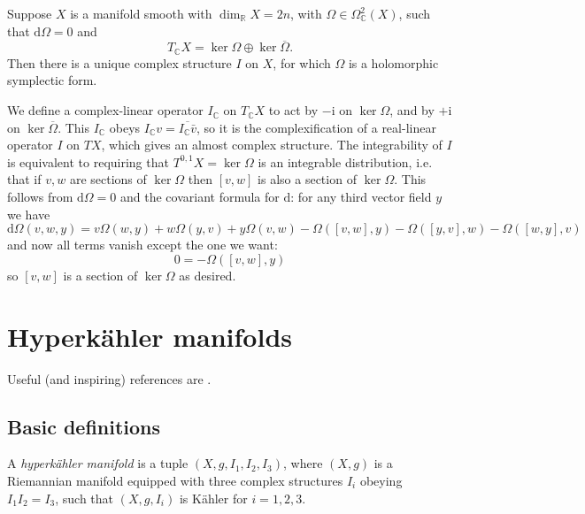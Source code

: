 \documentclass[12pt,letterpaper,reqno]{article}
\numberwithin{equation}{section}
\newcommand{\R}{\ensuremath{\mathbb R}}
\newcommand{\C}{\ensuremath{\mathbb C}}
\newcommand{\kahler}{K\"ahler\xspace}
\newcommand{\hk}{hyperk\"ahler\xspace}
\newcommand{\Hk}{Hyperk\"ahler\xspace}
\newcommand{\I}{{\mathrm i}}
\newcommand{\de}{\mathrm{d}}
\newcommand{\ti}[1]{\textit{#1}}
\begin{document}
\begin{prop} \label{prop:hol-symp-to-complex}
Suppose $X$ is a manifold smooth with $\dim_\R X = 2n$, 
with $\Omega \in \Omega^2_\C(X)$, such that $\de \Omega = 0$ and
\begin{equation}
 T_\C X = \ker \Omega \oplus \ker \overline\Omega. 
\end{equation}
Then there is a 
unique complex structure $I$ on $X$, for which $\Omega$
is a holomorphic symplectic form.
\end{prop}
\begin{pf} We define a complex-linear operator 
$I_\C$ on $T_\C X$ to act by $-\I$ on
$\ker \Omega$, and by $+\I$ on $\ker \overline\Omega$.
This $I_\C$ obeys $I_\C v = \overline{I_\C \bar{v}}$, so it is the 
complexification of a real-linear operator $I$ on $TX$,
which gives an almost complex structure.
The integrability of $I$ is equivalent to requiring
that $T^{0,1} X = \ker \Omega$ is an integrable distribution,
i.e. that if $v,w$ are sections of $\ker \Omega$ then $[v,w]$
is also a section of $\ker \Omega$.
This follows from $\de \Omega = 0$ and the covariant formula
for $\de$: for any third vector field $y$ we have
\begin{equation}
  \de \Omega(v,w,y) = v \Omega(w,y) + w \Omega(y,v) + y \Omega(v,w)
  - \Omega([v,w],y) - \Omega([y,v],w) - \Omega([w,y],v)
\end{equation}
and now all terms vanish except the one we want:
\begin{equation}
  0 = -\Omega([v,w],y)
\end{equation}
so $[v,w]$ is a section of $\ker \Omega$ as desired.
\end{pf}



\section{Hyperk\"ahler manifolds}

Useful (and inspiring) references are \cite{MR88f:53087,Hitchin-hk,MR1798605,boalch-notes}.

\subsection{Basic definitions}

\begin{defn}[\Hk manifold] A \ti{\hk manifold} is 
a tuple $(X,g,I_1,I_2,I_3)$, where $(X,g)$ is a Riemannian 
manifold equipped with three complex 
structures $I_i$ obeying $I_1 I_2 = I_3$,
such that $(X,g,I_i)$ is \kahler for $i=1,2,3$.
\end{defn}
\end{document}
